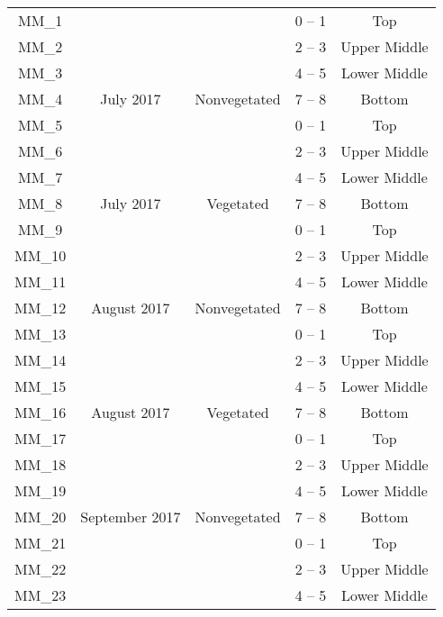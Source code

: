 \documentclass[
  12 pt,
]{article}
\begin{document}
\begin{singlespace}
\begin{longtable}[t]{ccccc}
\endfoot
\bottomrule
\endlastfoot
MM\_1 &  &  & 0 – 1 & Top\\
\nopagebreak
MM\_2 &  &  & 2 – 3 & Upper Middle\\
\nopagebreak
MM\_3 &  &  & 4 – 5 & Lower Middle\\
\nopagebreak
MM\_4 & \multirow{-4}{*}{\centering\arraybackslash 12 July 2017} & \multirow{-4}{*}{\centering\arraybackslash Nonvegetated} & 7 – 8 & Bottom\\
\cmidrule{1-5}\pagebreak[0]
MM\_5 &  &  & 0 – 1 & Top\\
\nopagebreak
MM\_6 &  &  & 2 – 3 & Upper Middle\\
\nopagebreak
MM\_7 &  &  & 4 – 5 & Lower Middle\\
\nopagebreak
MM\_8 & \multirow{-4}{*}{\centering\arraybackslash 12 July 2017} & \multirow{-4}{*}{\centering\arraybackslash Vegetated} & 7 – 8 & Bottom\\
\cmidrule{1-5}\pagebreak[0]
MM\_9 &  &  & 0 – 1 & Top\\
\nopagebreak
MM\_10 &  &  & 2 – 3 & Upper Middle\\
\nopagebreak
MM\_11 &  &  & 4 – 5 & Lower Middle\\
\nopagebreak
MM\_12 & \multirow{-4}{*}{\centering\arraybackslash 9 August 2017} & \multirow{-4}{*}{\centering\arraybackslash Nonvegetated} & 7 – 8 & Bottom\\
\cmidrule{1-5}\pagebreak[0]
MM\_13 &  &  & 0 – 1 & Top\\
\nopagebreak
MM\_14 &  &  & 2 – 3 & Upper Middle\\
\nopagebreak
MM\_15 &  &  & 4 – 5 & Lower Middle\\
\nopagebreak
MM\_16 & \multirow{-4}{*}{\centering\arraybackslash 9 August 2017} & \multirow{-4}{*}{\centering\arraybackslash Vegetated} & 7 – 8 & Bottom\\
\cmidrule{1-5}\pagebreak[0]
MM\_17 &  &  & 0 – 1 & Top\\
\nopagebreak
MM\_18 &  &  & 2 – 3 & Upper Middle\\
\nopagebreak
MM\_19 &  &  & 4 – 5 & Lower Middle\\
\nopagebreak
MM\_20 & \multirow{-4}{*}{\centering\arraybackslash 14 September 2017} & \multirow{-4}{*}{\centering\arraybackslash Nonvegetated} & 7 – 8 & Bottom\\
\cmidrule{1-5}\pagebreak[0]
MM\_21 &  &  & 0 – 1 & Top\\
\nopagebreak
MM\_22 &  &  & 2 – 3 & Upper Middle\\
\nopagebreak
MM\_23 &  &  & 4 – 5 & Lower Middle\\

\end{longtable}
\end{singlespace}
\end{document}
